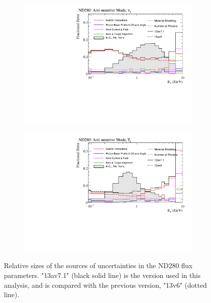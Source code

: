 \begin{figure}[!htbp]
\begin{subfigure}{.49\textwidth}
\end{subfigure}
\begin{subfigure}{.49\textwidth}
  \centering
  \includegraphics[width=0.99\linewidth]{figs/flux_error_t2k_nd5_rhc_nue}
\end{subfigure}
\begin{subfigure}{.49\textwidth}
  \centering
  \includegraphics[width=0.99\linewidth]{figs/flux_error_t2k_nd5_rhc_nuebar}
\end{subfigure}
\caption{Relative sizes of the sources of uncertainties in the ND280 flux parameters. "13av7.1" (black solid line) is the version used in this analysis, and is compared with the previous version, "13v6" (dotted line).}\label{fig:fluxsourceND}
\end{figure}

